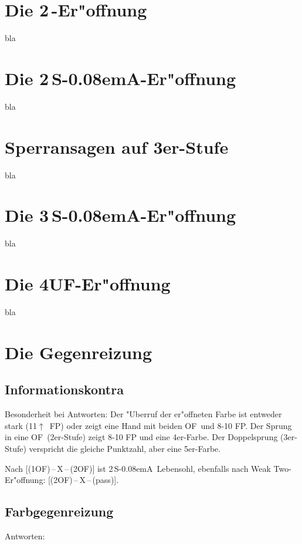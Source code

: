 \documentclass[11pt,german,twocolumn]{scrartcl}
\renewcommand{\Sp}{{\color{SpColor}{\spades}}}
\def\pik{\,\Sp}
\def\pl{$\uparrow$}
\def\ufa{\textsf{UF}}
\def\ofa{\textsf{OF}}
\def\sa{\textsf{S\kern-0.08emA}}
\def\SA{\,\sa}
\def\kontra{\textsf{X}}
\def\sep{\,--\,}
\begin{document}
\section{Die 2\pik-Er"offnung}

bla

\section{Die 2\SA-Er"offnung}

bla

\section{Sperransagen auf 3er-Stufe}

bla

\section{Die 3\SA-Er"offnung}

bla

\section{Die 4\ufa-Er"offnung}

bla

\section{Die Gegenreizung}

\subsection{Informationskontra}

Besonderheit bei Antworten: Der "Uberruf der er"offneten Farbe ist entweder
stark (11\pl\ FP) oder zeigt eine Hand mit beiden \ofa\ und 8-10 FP. Der Sprung
in eine \ofa\ (2er-Stufe) zeigt 8-10 FP und eine 4er-Farbe. Der Doppelsprung
(3er-Stufe) verspricht die gleiche Punktzahl, aber eine 5er-Farbe.

Nach [(1\ofa)\sep\kontra\sep(2\ofa)] ist 2\SA\ Lebensohl, ebenfalls nach Weak Two-
Er"offnung: [(2\ofa)\sep\kontra\sep(pass)].

\subsection{Farbgegenreizung}

Antworten:
\end{document}
